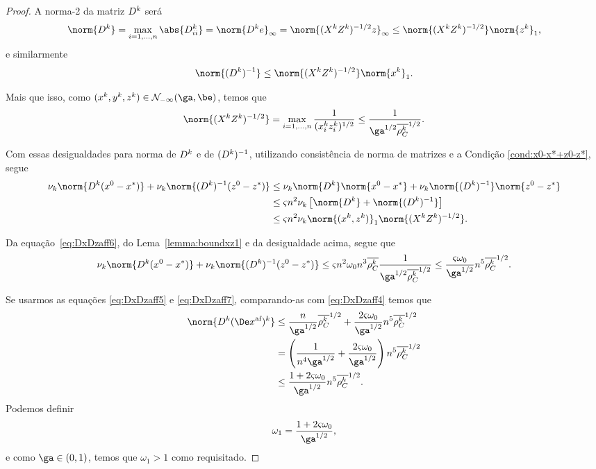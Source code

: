 \begin{proof}

A norma-2 da matriz  $D^{k}$ será
\[
 \norm{\Dk} = \max_{i=1,\ldots,n} \abs{\Dk_{ii}} = \norm{\Dk e}_{\infty} = \norm{(\Xk\Zk)^{-1/2}z}_{\infty} \leq \norm{(\Xk\Zk)^{-1/2}}\norm{\zk}_{1},
\]
e similarmente
\[
\norm{\Dik} \leq  \norm{(\Xk\Zk)^{-1/2}} \norm{\xk}_{1}.
\]

Mais que isso, como $(\xk,\yk,\zk)\in\Nset_{-\infty}(\ga,\be)$, temos que 
\begin{equation}
\label{eq:DxDzaff6}
	\norm{(\Xk\Zk)^{-1/2}} = \max_{i=1,\ldots,n}\frac{1}{(\xk_i\zk_i)^{1/2}} \leq \frac{1}{\ga^{1/2}\dbvec{\rho_{C}^k}^{1/2}}.
\end{equation}

Com essas desigualdades para norma de $D^{k}$ e de $(D^{k})^{-1}$, utilizando consistência de norma de matrizes e a Condição \ref{cond:x0-x*+z0-z*}, segue 
\begin{align*}
 \nu_k \norm{\Dk(\xzero - \xstar)} + \nu_k \norm{\Dik(\zzero - \zstar)}  & \leq \nu_k \norm{\Dk}\norm{\xzero - \xstar} + \nu_k \norm{\Dik}\norm{\zzero - \zstar} \notag \\
 					& \leq \bdxzstar n^2 \nu_k\left[  \norm{\Dk} + \norm{\Dik}   \right] \notag \\ 
 					& \leq \bdxzstar n^2 \nu_k\norm{(\xk,\zk)}_{1}\norm{(\Xk\Zk)^{-1/2}} .\notag
\end{align*}

Da equação~\eqref{eq:DxDzaff6}, do Lema~\ref{lemma:boundxz1} e da desigualdade acima, segue que 
\begin{equation} \label{eq:DxDzaff7}
 \nu_k \norm{\Dk(\xzero - \xstar)} + \nu_k \norm{\Dik(\zzero - \zstar)}  \leq \bdxzstar n^2 \omega_{0} n^{3} \dbvec{\rho_C^{k}}\frac{1}{\ga^{1/2}\dbvec{\rho_{C}^k}^{1/2}} \leq   \frac{\bdxzstar  \omega_{0}}{\ga^{1/2}} n^{5} \dbvec{\rho_C^{k}}^{1/2} .
\end{equation}

Se usarmos as equações \eqref{eq:DxDzaff5} e \eqref{eq:DxDzaff7}, comparando-as com \eqref{eq:DxDzaff4} temos que 
\begin{align*}
\norm{\Dk \dekx} & \leq \frac{n}{\ga^{1/2}}\dbvec{\rho_C^k }^{1/2} +  \frac{2\bdxzstar  \omega_{0}}{\ga^{1/2}} n^{5} \dbvec{\rho_C^{k}}^{1/2} \\
				& = \left( \frac{1}{n^{4}\ga^{1/2}} +  \frac{2\bdxzstar  \omega_{0}}{\ga^{1/2}} \right)n^{5} \dbvec{\rho_C^{k}}^{1/2}\\
				& \leq \frac{1 + 2\bdxzstar  \omega_{0}}{\ga^{1/2}} n^{5} \dbvec{\rho_C^{k}}^{1/2}.
\end{align*}
Podemos definir
\begin{equation}
	\label{eq:omega1}
	\omega_1 = \frac{1 + 2\bdxzstar  \omega_{0}}{\ga^{1/2}},
\end{equation}
e como  $\ga\in(0,1)$, temos que $\omega_1>1$ como requisitado.
\end{proof}

